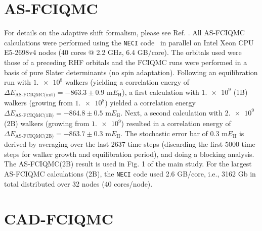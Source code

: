\documentclass[journal=jcp,manuscript=suppinfo]{achemso}
\begin{document}
\section{AS-FCIQMC}\label{as_fciqmc_SI_sect}

For details on the adaptive shift formalism, please see Ref. . All AS-FCIQMC calculations were performed using the {\texttt{NECI}} code~\cite{neci,neci_jcp_2020} in parallel on Intel Xeon CPU E5-2698v4 nodes (40 cores $@$ 2.2 GHz, 6.4 GB/core). The orbitals used were those of a preceding RHF orbitals and the FCIQMC runs were performed in a basis of pure Slater determinants (no spin adaptation). Following an equilibration run with $\num{1.e8}$ walkers (yielding a correlation energy of $\Delta E_{\text{AS-FCIQMC(init)}} = -863.3\pm0.9$ m$E_{\text{H}}$), a first calculation with $\num{1.e9}$ (1B) walkers (growing from $\num{1.e8}$) yielded a correlation energy $\Delta E_{\text{AS-FCIQMC(1B)}} = -864.8\pm0.5$ m$E_{\text{H}}$. Next, a second calculation with $\num{2.e9}$ (2B) walkers (growing from $\num{1.e9}$) resulted in a correlation energy of $\Delta E_{\text{AS-FCIQMC(2B)}} = -863.7\pm0.3$ m$E_{\text{H}}$. The stochastic error bar of $0.3$ m$E_{\text{H}}$ is derived by averaging over the last 2637 time steps (discarding the first 5000 time steps for walker growth and equilibration period), and doing a blocking analysis. The AS‐FCIQMC(2B) result is used in Fig. 1 of the main study. For the largest AS-FCIQMC calculations (2B), the {\texttt{NECI}} code used 2.6 GB/core, i.e., 3162 Gb in total distributed over 32 nodes (40 cores/node).


\section{CAD-FCIQMC}
\label{cad_fciqmc_SI_sect}
\end{document}
